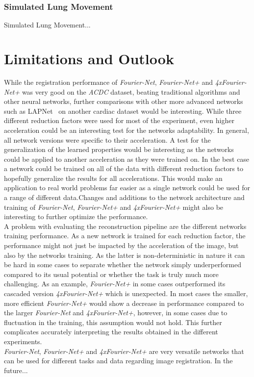 \subsubsection{Simulated Lung Movement}
Simulated Lung Movement...

\section{Limitations and Outlook}
While the registration performance of \emph{Fourier-Net}, \emph{Fourier-Net+} and \emph{4xFourier-Net+} was very good on the \emph{ACDC} dataset, beating traditional algorithms and other neural networks, further comparisons with other more advanced networks such as LAPNet~\cite{LAPNet} on another cardiac dataset would be interesting. While three different reduction factors were used for most of the experiment, even higher acceleration could be an interesting test for the networks adaptability. In general, all network versions were specific to their acceleration. A test for the generalization of the learned properties would be interesting as the networks could be applied to another acceleration as they were trained on. In the best case a network could be trained on all of the data with different reduction factors to hopefully generalize the results for all accelerations. This would make an application to real world problems far easier as a single network could be used for a range of different data.Changes and additions to the network architecture and training of \emph{Fourier-Net}, \emph{Fourier-Net+} and \emph{4xFourier-Net+} might also be interesting to further optimize the performance.\\
A problem with evaluating the reconstruction pipeline are the different networks training performance. As a new network is trained for each reduction factor, the performance might not just be impacted by the acceleration of the image, but also by the networks training. As the latter is non-deterministic in nature it can be hard in some cases to separate whether the network simply underperformed compared to its usual potential or whether the task is truly much more challenging. As an example, \emph{Fourier-Net+} in some cases outperformed its cascaded version \emph{4xFourier-Net+} which is unexpected. In most cases the smaller, more efficient \emph{Fourier-Net+} would show a decrease in performance compared to the larger \emph{Fourier-Net} and \emph{4xFourier-Net+}, however, in some cases due to fluctuation in the training, this assumption would not hold. This further complicates accurately interpreting the results obtained in the different experiments.\\
\emph{Fourier-Net}, \emph{Fourier-Net+} and \emph{4xFourier-Net+} are very versatile networks that can be used for different tasks and data regarding image registration. In the future... 